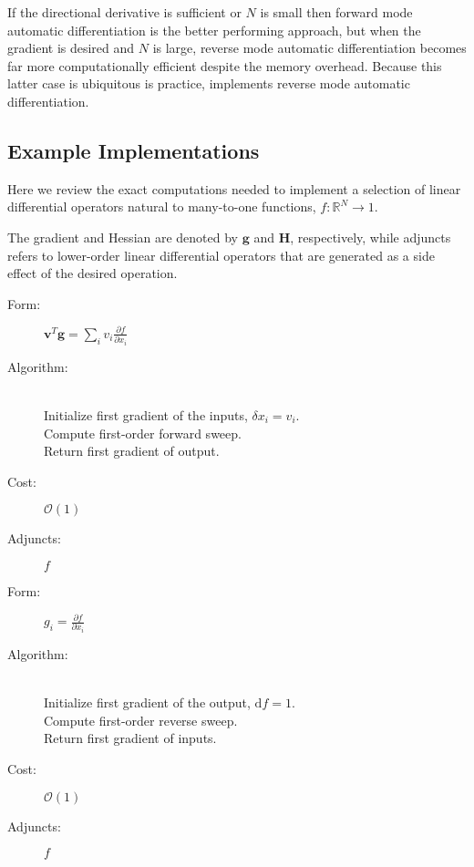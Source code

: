 If the directional derivative is sufficient or $N$ is small then forward mode automatic
differentiation is the better performing approach, but when the gradient is desired and 
$N$ is large, reverse mode automatic differentiation becomes far more computationally 
efficient despite the memory overhead.  Because this latter case is ubiquitous is
practice, \nomad implements reverse mode automatic differentiation.

\subsection{Example Implementations}

Here we review the exact computations needed to implement a selection of
linear differential operators natural to many-to-one functions, 
$f : \mathbb{R}^{N} \rightarrow 1$.

The gradient and Hessian are denoted by $\mathbf{g}$ and $\mathbf{H}$, respectively,
while adjuncts refers to lower-order linear differential operators that are generated
as a side effect of the desired operation.

\begin{tcolorbox}[colback=white,colframe=gray90, coltitle=black,boxrule=3pt,
fonttitle=\bfseries,title=Directional Derivative]

	\begin{description}
		\item[Form:] $\displaystyle \mathbf{v}^{T} \mathbf{g} = \sum_{i} v_{i} \frac{ \partial f }{ \partial x_{i} } $
		\item[Algorithm:] \hfill \\
		Initialize first gradient of the inputs, $\delta x_{i} = v_{i}$. \\
		Compute first-order forward sweep. \\
		Return first gradient of output.
		\item[Cost:] $\mathcal{O} \! \left( 1 \right)$
		\item[Adjuncts:] $ f $
	\end{description}
	
\end{tcolorbox}

\begin{tcolorbox}[colback=white,colframe=gray90, coltitle=black,boxrule=3pt,
fonttitle=\bfseries,title=Gradient]
	
	\begin{description}
		\item[Form:] $\displaystyle g_{i} = \frac{ \partial f }{ \partial x_{i} } $
		\item[Algorithm:] \hfill \\
		Initialize first gradient of the output, $\mathrm{d} f = 1$. \\
		Compute first-order reverse sweep. \\
		Return first gradient of inputs.
		\item[Cost:] $\mathcal{O} \! \left( 1 \right)$
		\item[Adjuncts:] $ f $
	\end{description}
	
\end{tcolorbox}

